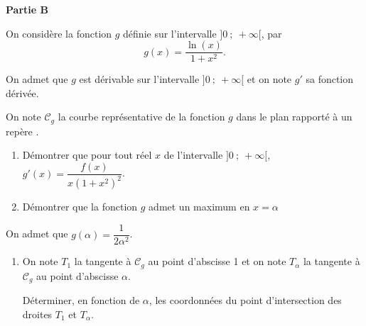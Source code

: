 \bigskip

\textbf{Partie B}

\medskip

On considère la fonction $g$ définie sur l'intervalle $]0~;~+ \infty[$, par 
\[g(x) = \dfrac{\ln (x)}{1 + x^2}.\]

On admet que $g$ est dérivable sur l'intervalle $]0~;~+ \infty[$ et on note $g'$ sa fonction dérivée.

On note $\mathcal{C}_g$ la courbe représentative de la fonction $g$ dans le plan rapporté à un repère \Oij.

\medskip

\begin{enumerate}
\item Démontrer que pour tout réel $x$ de l'intervalle $]0~;~+ \infty[$, \: $g'(x) = \dfrac{f(x)}{x\left(1 + x^2\right)^2}$.
\item Démontrer que la fonction $g$ admet un maximum en $x = \alpha$
\end{enumerate}

On admet que $g(\alpha) = \dfrac{1}{2\alpha^2}$.

\begin{enumerate}[resume]
\item On note $T_1$ la tangente à $\mathcal{C}_g$ au point d'abscisse 1 et on note $T_{\alpha}$ la tangente à $\mathcal{C}_g$ au point d'abscisse $\alpha$.

Déterminer, en fonction de $\alpha$, les coordonnées du point d'intersection des droites $T_1$ et $T_{\alpha}$.
\end{enumerate}

\bigskip

